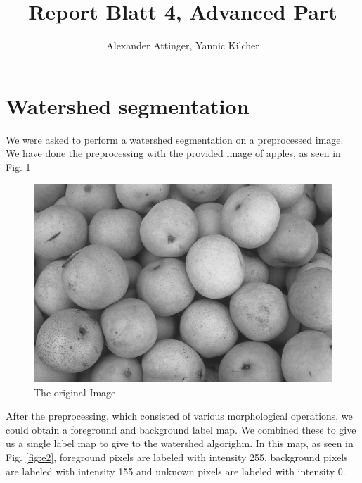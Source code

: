 \documentclass[11pt,a4paper]{article}
\author{Alexander Attinger, Yannic Kilcher}
\title{Report Blatt 4, Advanced Part}
\begin{document}
\maketitle

\section{Watershed segmentation}
We were asked to perform a watershed segmentation on a preprocessed image. We have done the preprocessing with the provided image of apples, as seen in Fig. \ref{fig:e1}
\begin{figure}

\includegraphics[scale=.5]{data/res/adv/apples.png}
\caption{The original Image}%
\label{fig:e1}
\end{figure}

After the preprocessing, which consisted of various morphological operations, we could obtain a foreground and background label map. We combined these to give us a single label map to give to the watershed algorighm. In this map, as seen in Fig. \ref{fig:e2}, foreground pixels are labeled with intensity 255, background pixels are labeled with intensity 155 and unknown pixels are labeled with intensity 0.
\end{document}
